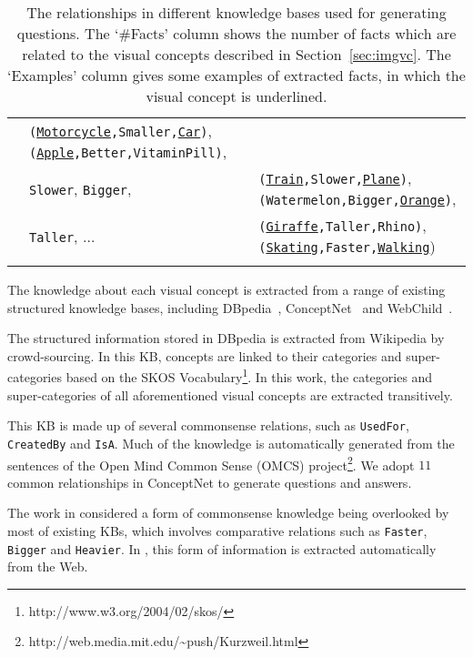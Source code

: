 \documentclass[10pt,journal]{IEEEtran}
\def\bluett{}
\begin{document}
\begin{table*}[tpb!]
{{\begin{tabular}{l|p{2.4cm}|c|l}
&\texttt{(\underline{Motorcycle},Smaller,\underline{Car})}, \texttt{(\underline{Apple},Better,VitaminPill)},\\
&\texttt{Slower}, \texttt{Bigger},  &
&\texttt{(\underline{Train},Slower,\underline{Plane})}, \texttt{(Watermelon,Bigger,\underline{Orange})}, \\
&\texttt{Taller},	$\dots$      &
&\texttt{(\underline{Giraffe},Taller,Rhino)}, \bluett{\texttt{(\underline{Skating},Faster,\underline{Walking}})}  
\\[-2ex] \\ 
\hline
\end{tabular}}
\footnotesize
\caption{ The relationships in different knowledge bases used for generating questions.
The `\#Facts' column shows the number of facts which are related to the visual concepts described in Section~\ref{sec:imgvc}.
The `Examples' column gives some examples of extracted facts, in which the visual concept is underlined.
}
\label{tab:predicates}
}
\vspace{-5pt}
\end{table*}


The knowledge about each visual concept is extracted from a range of existing structured knowledge bases,
including DBpedia~\cite{auer2007dbpedia}, ConceptNet~\cite{liu2004conceptnet} and WebChild~\cite{tandon2014acquiring}.







The structured information stored in DBpedia is extracted from Wikipedia by crowd-sourcing.
In this KB, concepts are linked to their categories and super-categories based on the SKOS Vocabulary\footnote{http://www.w3.org/2004/02/skos/}.
In this work, the categories and super-categories of all aforementioned visual concepts are extracted transitively.

This KB is made up of several commonsense relations, such as \texttt{UsedFor}, \texttt{CreatedBy} and \texttt{IsA}.
Much of the knowledge is automatically generated from the sentences of
the Open Mind Common Sense (OMCS) project\footnote{http://web.media.mit.edu/{\textasciitilde}push/Kurzweil.html}.
We adopt $11$ common relationships in ConceptNet to generate questions and answers.

The work in \cite{tandon2014acquiring} considered a form of commonsense knowledge being overlooked by most of existing KBs,
which involves comparative relations such as \texttt{Faster}, \texttt{Bigger} and \texttt{Heavier}.
In \cite{tandon2014acquiring}, this form of information is extracted automatically from the Web.
\end{document}
